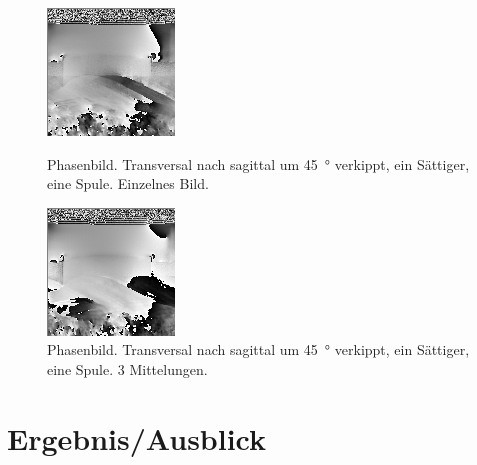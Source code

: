 \documentclass[
    11pt,
    ngerman
]{scrbook}
\begin{document}
\begin{figure}[htbp]
    \begin{minipage}[htbp]{.45\textwidth}
        \centering
        \includegraphics[width=.9\textwidth]{Abbildungen/2015-03-13_27_1.png}
        \caption{Phasenbild. Transversal nach sagittal um \SI{45}{\degree} verkippt, ein Sättiger, eine Spule. Einzelnes Bild.}
        \label{fig:2015-03-13_27_1}
    \end{minipage}
    \hfill
    \begin{minipage}[htbp]{.45\textwidth}
        \centering
        \includegraphics[width=.9\textwidth]{Abbildungen/2015-03-13_29_1.png}
    \caption{Phasenbild. Transversal nach sagittal um \SI{45}{\degree} verkippt, ein Sättiger, eine Spule. 3 Mittelungen.}
        \label{fig:2015-03-13_29_1}
    \end{minipage}
\end{figure}

    \chapter{Ergebnis/Ausblick}

    
\end{document}
